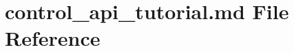 \hypertarget{docs_2control__api__tutorial_8md}{}\section{control\+\_\+api\+\_\+tutorial.\+md File Reference}
\label{docs_2control__api__tutorial_8md}
